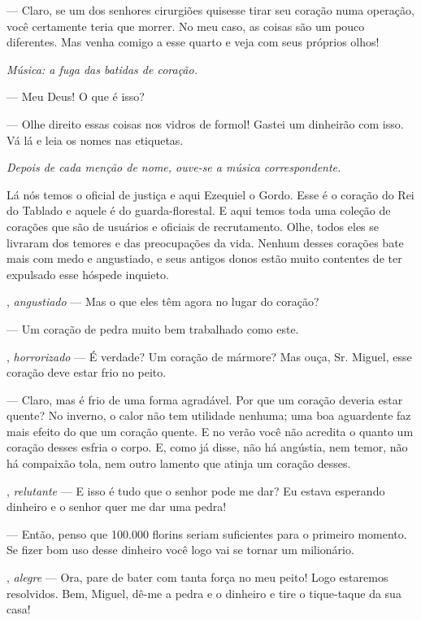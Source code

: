 \begin{myparindent}{0pt}
\begin{Parskip}
 --- Claro, se um dos senhores cirurgiões quisesse tirar
seu coração numa operação, você certamente teria que morrer. No meu
caso, as coisas são um pouco diferentes. Mas venha comigo a esse quarto
e veja com seus próprios olhos!

\emph{Música: a fuga das batidas de coração.}

 --- Meu Deus! O que é isso?

 --- Olhe direito essas coisas nos vidros de formol!
Gastei um dinheirão com isso. Vá lá e leia os nomes nas etiquetas.

\emph{Depois de cada menção de nome, ouve-se a música correspondente.}

Lá nós temos o oficial de justiça e aqui Ezequiel o Gordo. Esse é o
coração do Rei do Tablado e aquele é do guarda-florestal. E aqui temos
toda uma coleção de corações que são de usuários e oficiais de
recrutamento. Olhe, todos eles se livraram dos temores e das
preocupações da vida. Nenhum desses corações bate mais com medo e
angustiado, e seus antigos donos estão muito contentes de ter expulsado
esse hóspede inquieto.

, \emph{angustiado} --- Mas o que eles têm agora no
lugar do coração?

 --- Um coração de pedra muito bem trabalhado como este.

, \emph{horrorizado} --- É verdade? Um coração de
mármore? Mas ouça, Sr. Miguel, esse coração deve estar frio no peito.

 --- Claro, mas é frio de uma forma agradável. Por que
um coração deveria estar quente? No inverno, o calor não tem utilidade
nenhuma; uma boa aguardente faz mais efeito do que um coração quente. E
no verão você não acredita o quanto um coração desses esfria o corpo. E,
como já disse, não há angústia, nem temor, não há compaixão tola, nem
outro lamento que atinja um coração desses.

, \emph{relutante} --- E isso é tudo que o senhor
pode me dar? Eu estava esperando dinheiro e o senhor quer me dar uma
pedra!

 --- Então, penso que 100.000 florins seriam suficientes
para o primeiro momento. Se fizer bom uso desse dinheiro você logo vai
se tornar um milionário.

, \emph{alegre} --- Ora, pare de bater com tanta
força no meu peito! Logo estaremos resolvidos. Bem, Miguel, dê-me a
pedra e o dinheiro e tire o tique-taque da sua casa!


\end{Parskip}
\end{myparindent}
